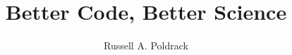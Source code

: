 \documentclass{EngD}
\theoremstyle{plain}
\theoremstyle{definition}
\begin{document}
  \title[Software Engineering for Reproducible Science in
the Age of AI]
    {Better Code, Better Science}
  \author{Russell A. Poldrack}


  \maketitle
  \tableofcontents

  \mainmatter

\tableofcontents
\listoffigures
\listoftables

\mainmatter






























\printindex
\end{document}
